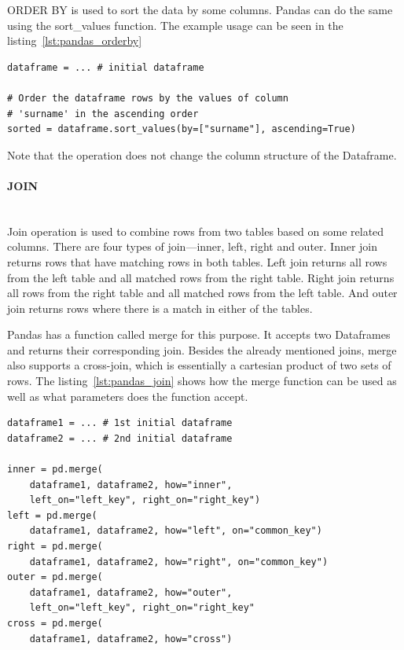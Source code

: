 ORDER BY is used to sort the data by some columns.
Pandas can do the same using the sort\_values function.
The example usage can be seen in the listing~\ref{lst:pandas_orderby}

\begin{lstlisting}[caption=Order by in Pandas, label={lst:pandas_orderby}, captionpos=b]
dataframe = ... # initial dataframe

# Order the dataframe rows by the values of column
# 'surname' in the ascending order
sorted = dataframe.sort_values(by=["surname"], ascending=True)
\end{lstlisting}

Note that the operation does not change the column structure of the Dataframe.

\paragraph{JOIN} \leavevmode \\

Join operation is used to combine rows from two tables based on some related columns.
There are four types of join---inner, left, right and outer.
Inner join returns rows that have matching rows in both tables.
Left join returns all rows from the left table and all matched rows from the right table.
Right join returns all rows from the right table and all matched rows from the left table.
And outer join returns rows where there is a match in either of the tables.

Pandas has a function called merge for this purpose.
It accepts two Dataframes and returns their corresponding join.
Besides the already mentioned joins, merge also supports a cross-join, which is essentially a cartesian product of
two sets of rows.
The listing~\ref{lst:pandas_join} shows how the merge function can be used as well as what parameters does the
function accept.

\begin{lstlisting}[caption=Join in Pandas, label={lst:pandas_join}, captionpos=b]
dataframe1 = ... # 1st initial dataframe
dataframe2 = ... # 2nd initial dataframe

inner = pd.merge(
    dataframe1, dataframe2, how="inner",
    left_on="left_key", right_on="right_key")
left = pd.merge(
    dataframe1, dataframe2, how="left", on="common_key")
right = pd.merge(
    dataframe1, dataframe2, how="right", on="common_key")
outer = pd.merge(
    dataframe1, dataframe2, how="outer",
    left_on="left_key", right_on="right_key"
cross = pd.merge(
    dataframe1, dataframe2, how="cross")
\end{lstlisting}

